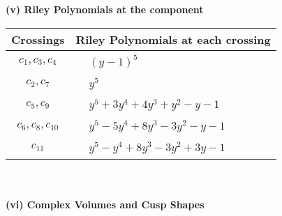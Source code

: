 \documentclass[1p]{elsarticle_modified}
\theoremstyle{definition}
\begin{document}
\newpage\renewcommand{\arraystretch}{1}
\flushleft \textbf{(v) Riley Polynomials at the component}\newline \\
\begin{tabular}{m{50pt}|m{274pt}}
Crossings & \hspace{64pt}Riley Polynomials at each crossing \\
\hline $$\begin{aligned}c_{1},c_{3},c_{4}\end{aligned}$$&$\begin{aligned}
&(y-1)^5
\end{aligned}$\\
\hline $$\begin{aligned}c_{2},c_{7}\end{aligned}$$&$\begin{aligned}
&y^5
\end{aligned}$\\
\hline $$\begin{aligned}c_{5},c_{9}\end{aligned}$$&$\begin{aligned}
&y^5+3 y^4+4 y^3+y^2- y-1
\end{aligned}$\\
\hline $$\begin{aligned}c_{6},c_{8},c_{10}\end{aligned}$$&$\begin{aligned}
&y^5-5 y^4+8 y^3-3 y^2- y-1
\end{aligned}$\\
\hline $$\begin{aligned}c_{11}\end{aligned}$$&$\begin{aligned}
&y^5- y^4+8 y^3-3 y^2+3 y-1
\end{aligned}$\\
\hline
\end{tabular}\\~\\
\newpage\flushleft \textbf{(vi) Complex Volumes and Cusp Shapes}
\end{document}
